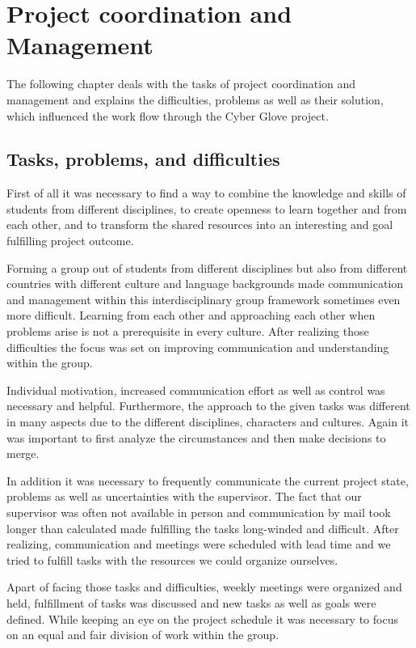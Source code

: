 \section{Project coordination and Management}

The following chapter deals with the tasks of project coordination and management and explains the difficulties, problems as well as their solution, which influenced the work flow through the Cyber Glove project.

\subsection{Tasks, problems, and difficulties}

First of all it was necessary to find a way to combine the knowledge and skills of students from different disciplines, to create openness to learn together and from each other, and to transform the shared resources into an interesting and goal fulfilling project outcome.

Forming a group out of students from different disciplines but also from different countries with different culture and language backgrounds made communication and management within this interdisciplinary group framework sometimes even more difficult. Learning from each other and approaching each other when problems arise is not a prerequisite in every culture. After realizing those difficulties the focus was set on improving communication and understanding within the group. 

Individual motivation, increased communication effort as well as control was necessary and helpful. Furthermore, the approach to the given tasks was different in many aspects due to the different disciplines, characters and cultures. Again it was important to first analyze the circumstances and then make decisions to merge.

In addition it was necessary to frequently communicate the current project state, problems as well as uncertainties with the supervisor. The fact that our supervisor was often not available in person and communication by mail took longer than calculated made fulfilling the tasks long-winded and difficult. After realizing, communication and meetings were scheduled with lead time and we tried to fulfill tasks with the resources we could organize ourselves. 

Apart of facing those tasks and difficulties, weekly meetings were organized and held, fulfillment of tasks was discussed and new tasks as well as goals were defined. While keeping an eye on the project schedule it was necessary to focus on an equal and fair division of work within the group. 

